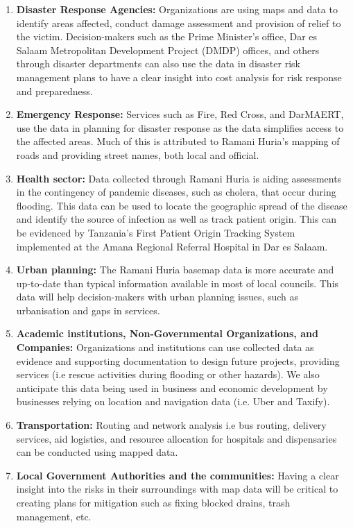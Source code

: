 \documentclass[a4paper,12pt,twoside]{article}
\begin{document}
\begin{enumerate}
\item \textbf{Disaster Response Agencies:} Organizations are using maps and data to identify areas affected, conduct damage assessment and provision of relief to the victim. Decision-makers such as the Prime Minister's office, Dar es Salaam Metropolitan Development Project (DMDP) offices, and others through disaster departments can also use the data in disaster risk management plans to have a clear insight into cost analysis for risk response and preparedness.
\item \textbf{Emergency Response:} Services such as Fire, Red Cross, and DarMAERT, use the data in planning for disaster response as the data simplifies access to the affected areas. Much of this is attributed to Ramani Huria's mapping of roads and  providing street names, both local and official.
\item \textbf{Health sector:} Data collected through Ramani Huria is aiding assessments in the contingency of pandemic diseases, such as cholera, that occur during flooding. This data can be used to locate the geographic spread of the disease and identify the source of infection as well as track patient origin. This can be evidenced by Tanzania’s First Patient Origin Tracking System implemented at the Amana Regional Referral Hospital in Dar es Salaam.
\item \textbf{Urban planning:} The Ramani Huria basemap data is more accurate and up-to-date than typical information available in most of local councils. This data will help decision-makers with urban planning issues, such as urbanisation and gaps in services.
\item \textbf{Academic institutions, Non-Governmental Organizations, and Companies:} Organizations and institutions can use collected data as evidence and supporting documentation to design future projects, providing services (i.e rescue activities during flooding or other hazards). We also anticipate this data being used in business and economic development by businesses relying on location and navigation data (i.e. Uber and Taxify).
\item \textbf{Transportation:} Routing and network analysis i.e bus routing, delivery services, aid logistics, and resource allocation for hospitals and dispensaries can be conducted using mapped data.
\item \textbf{Local Government Authorities and the communities:} Having a clear insight into the risks in their surroundings with map data will be critical  to creating plans for mitigation such as fixing blocked drains, trash management, etc.

\end{enumerate}
\end{document}
